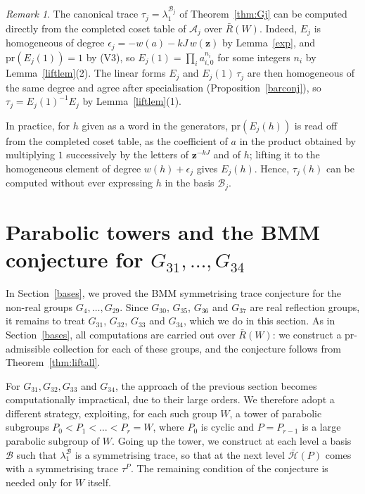 \documentclass[11pt, reqno]{amsart}
\newcommand{\cB}{\mathcal{B}}
\newcommand{\cH}{\mathcal{H}}
\numberwithin{equation}{section}
\theoremstyle{remark}
\newtheorem{remark}[theorem]{Remark}
\begin{document}
\begin{remark}\label{rem:Ej}
The canonical trace $\tau_j=\lambda_1^{\mathcal B_j}$ of
Theorem~\ref{thm:Gj} can be computed directly from the completed coset
table of $\mathcal A_j$ over $\bar R(W)$. Indeed, $E_j$ is homogeneous
of degree $\epsilon_j=-w(a)-kJ\,w(\mathbf z)$ by Lemma~\ref{exp}, and
$\mathrm{pr}(E_j(1))=1$ by (V3), so
$E_j(1)=\prod_ia_{i,0}^{n_i}$ for some integers $n_i$ by
Lemma~\ref{liftlem}(2). The linear forms $E_j$ and $E_j(1)\,\tau_j$ are
then homogeneous of the same degree and agree after specialisation
(Proposition~\ref{barconj}), so $\tau_j=E_j(1)^{-1}E_j$ by
Lemma~\ref{liftlem}(1).

In practice, for $h$ given as a word in the generators, $\mathrm{pr}(E_j(h))$ is read off from the completed coset table, as the coefficient of $a$ in the product obtained by multiplying $1$ successively by the letters of $\mathbf z^{-kJ}$ and of $h$; lifting it to the homogeneous element of degree $w(h)+\epsilon_j$ gives $E_j(h)$. Hence, $\tau_j(h)$ can be computed without ever expressing $h$ in the basis $\mathcal B_j$.
\end{remark}



\section{Parabolic towers and the BMM conjecture for $G_{31},\ldots,G_{34}$}\label{rem}

In Section~\ref{bases}, we proved the BMM symmetrising trace conjecture for the
non-real groups $G_4,\dots,G_{29}$. Since $G_{30}$, $G_{35}$, $G_{36}$
and $G_{37}$ are real reflection groups, it remains to treat $G_{31}$,
$G_{32}$, $G_{33}$ and $G_{34}$, which we do in this section. As in
Section~\ref{bases}, all computations are carried out over $\bar R(W)$: we
construct a $\mathrm{pr}$-admissible collection for each of these
groups, and the conjecture follows from Theorem~\ref{thm:liftall}.  


For $G_{31},G_{32},G_{33}$ and $G_{34}$, the approach of the previous section becomes computationally impractical, due to their large orders. We therefore adopt a different strategy, exploiting, for each such group $W$, a tower of parabolic subgroups $P_0<P_1<\dots<P_r=W$, where $P_0$ is cyclic and $P=P_{r-1}$ is a large parabolic subgroup of $W$. Going up the tower, we construct at each level a basis $\cB$ such that $\lambda_1^{\cB}$ is a symmetrising trace, so that at the next level $\bar{\cH}(P)$ comes with a symmetrising trace $\tau^P$. The remaining condition of the conjecture is needed only for $W$ itself.
\end{document}
